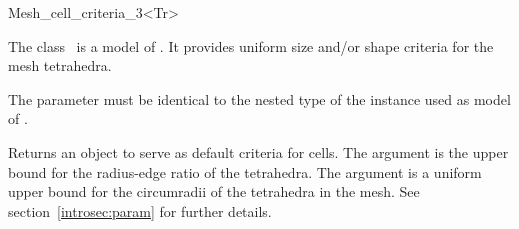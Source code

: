 \ccRefPageBegin


\begin{ccRefFunctionObjectClass}{Mesh_cell_criteria_3<Tr>}  %


\ccDefinition
  
The class \ccRefName\ is a model of . It provides
uniform size and/or shape criteria for the  mesh tetrahedra.


\ccParameters
The parameter  must be identical to the nested type
 of the instance used as model of
.

\ccIsModel
{}


\ccTypes


\ccCreation
{}  %

{Returns an object to serve as default criteria  for cells. The argument 
 is the  upper bound for the radius-edge ratio
of the tetrahedra. The argument  is a uniform upper bound
for the circumradii of the tetrahedra in the mesh. See
section~\ref{introsec:param} for further details.}



\ccSeeAlso

 \\
 \\
 \\




\end{ccRefFunctionObjectClass}

\ccRefPageEnd

